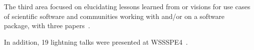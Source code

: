 \documentclass[11pt, oneside]{amsart}
\begin{document}
The third  area focused on elucidating lessons learned
from or visions for use cases of scientific software and communities working
with and\slash or on a software package, with three papers~\cite{Ganguly:2016ws, Shende:2016ws, Sallai:2016ws}.

In addition, 19 lightning talks were presented at WSSSPE4~\cite{Sufi:2016ws, Gesing:2016ws, Ram:2016ws, Loffler:2016ws, Katz:2016ws, Idaszak:2016ws, Hwang:2016ws, Goble:2016ws, Druskat:2016ws, Contrastin:2016ws, AAllen:2016ws, ChueHong:2016wsb, vanHage:2016ws, GAllen:2016wsb, Seidel:2016ws, Emsley:2016ws, Dongarra:2016ws, Bauer:2016ws, Aldabjan:2016ws}.


\end{document}
